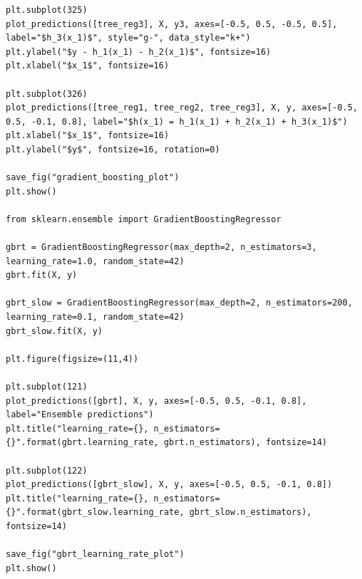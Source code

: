 \documentclass[%
oneside,                 %
final,                   %
10pt]{article}
\begin{document}
\begin{verbatim}
plt.subplot(325)
plot_predictions([tree_reg3], X, y3, axes=[-0.5, 0.5, -0.5, 0.5], label="$h_3(x_1)$", style="g-", data_style="k+")
plt.ylabel("$y - h_1(x_1) - h_2(x_1)$", fontsize=16)
plt.xlabel("$x_1$", fontsize=16)

plt.subplot(326)
plot_predictions([tree_reg1, tree_reg2, tree_reg3], X, y, axes=[-0.5, 0.5, -0.1, 0.8], label="$h(x_1) = h_1(x_1) + h_2(x_1) + h_3(x_1)$")
plt.xlabel("$x_1$", fontsize=16)
plt.ylabel("$y$", fontsize=16, rotation=0)

save_fig("gradient_boosting_plot")
plt.show()

from sklearn.ensemble import GradientBoostingRegressor

gbrt = GradientBoostingRegressor(max_depth=2, n_estimators=3, learning_rate=1.0, random_state=42)
gbrt.fit(X, y)

gbrt_slow = GradientBoostingRegressor(max_depth=2, n_estimators=200, learning_rate=0.1, random_state=42)
gbrt_slow.fit(X, y)

plt.figure(figsize=(11,4))

plt.subplot(121)
plot_predictions([gbrt], X, y, axes=[-0.5, 0.5, -0.1, 0.8], label="Ensemble predictions")
plt.title("learning_rate={}, n_estimators={}".format(gbrt.learning_rate, gbrt.n_estimators), fontsize=14)

plt.subplot(122)
plot_predictions([gbrt_slow], X, y, axes=[-0.5, 0.5, -0.1, 0.8])
plt.title("learning_rate={}, n_estimators={}".format(gbrt_slow.learning_rate, gbrt_slow.n_estimators), fontsize=14)

save_fig("gbrt_learning_rate_plot")
plt.show()

\end{verbatim}


\end{document}
